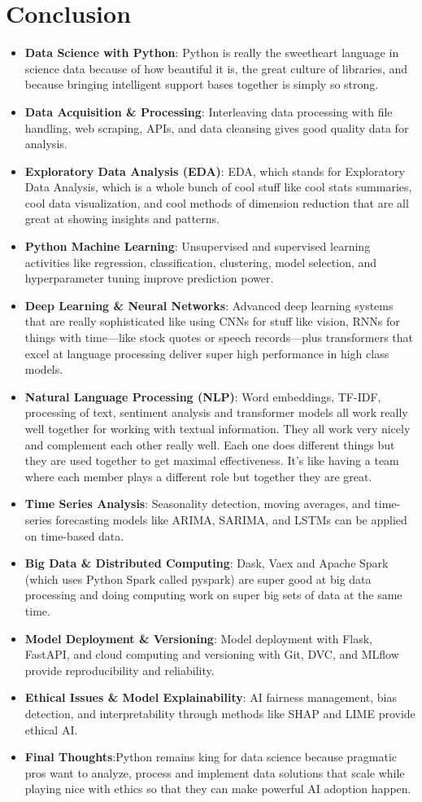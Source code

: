 \documentclass{article}
\begin{document}
\section{Conclusion}
\begin{itemize}
\item \textbf{Data Science with Python}: Python is really the sweetheart language in science data because of how beautiful it is, the great culture of libraries, and because bringing intelligent support bases together is simply so strong.
\item \textbf{Data Acquisition \& Processing}: Interleaving data processing with file handling, web scraping, APIs, and data cleansing gives good quality data for analysis.
\item \textbf{Exploratory Data Analysis (EDA)}: EDA, which stands for Exploratory Data Analysis, which is a whole bunch of cool stuff like cool stats summaries, cool data visualization, and cool methods of dimension reduction that are all great at showing insights and patterns.
\item \textbf{Python Machine Learning}: Unsupervised and supervised learning activities like regression, classification, clustering, model selection, and hyperparameter tuning improve prediction power.
\item \textbf{Deep Learning \& Neural Networks}: Advanced deep learning systems that are really sophisticated like using CNNs for stuff like vision, RNNs for things with time—like stock quotes or speech records—plus transformers that excel at language processing deliver super high performance in high class models.
\item \textbf{Natural Language Processing (NLP)}: Word embeddings, TF-IDF, processing of text, sentiment analysis and transformer models all work really well together for working with textual information. They all work very nicely and complement each other really well. Each one does different things but they are used together to get maximal effectiveness. It's like having a team where each member plays a different role but together they are great.
\item \textbf{Time Series Analysis}: Seasonality detection, moving averages, and time-series forecasting models like ARIMA, SARIMA, and LSTMs can be applied on time-based data.
\item \textbf{Big Data \& Distributed Computing}: Dask, Vaex and Apache Spark (which uses Python Spark called pyspark) are super good at big data processing and doing computing work on super big sets of data at the same time.
\item \textbf{Model Deployment \& Versioning}: Model deployment with Flask, FastAPI, and cloud computing and versioning with Git, DVC, and MLflow provide reproducibility and reliability.
\item \textbf{Ethical Issues \& Model Explainability}: AI fairness management, bias detection, and interpretability through methods like SHAP and LIME provide ethical AI.
\item \textbf{Final Thoughts}:Python remains king for data science because pragmatic pros want to analyze, process and implement data solutions that scale while playing nice with ethics  so that they can make powerful AI adoption happen.
\end{itemize}
\end{document}
